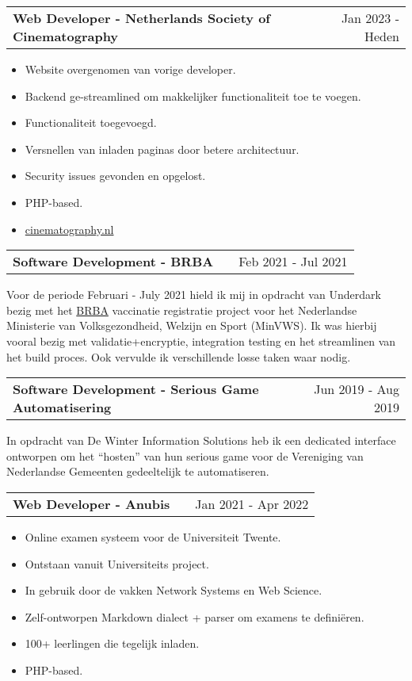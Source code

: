 \documentclass[a4paper,12pt]{article}
\makeatletter
\newenvironment{jobshort}[2]
    {
    \begin{tabularx}{\linewidth}{@{}l X r@{}}
    \textbf{#1} & \hfill &  #2 \\[3.75pt]
    \end{tabularx}
    }
    {
    }
\newenvironment{joblong}[2]
    {
    \begin{tabularx}{\linewidth}{@{}l X r@{}}
    \textbf{#1} & \hfill &  #2 \\[3.75pt]
    \end{tabularx}
    \begin{minipage}[t]{\linewidth}
    \begin{itemize}[nosep,after=\strut, leftmargin=1em, itemsep=3pt,label=--]
    }
    {
    \end{itemize}
    \end{minipage}    
    }
\makeatother
\begin{document}
\begin{joblong}{Web Developer - Netherlands Society of Cinematography}{Jan 2023 - Heden}
\item Website overgenomen van vorige developer.
\item Backend ge-streamlined om makkelijker functionaliteit toe te voegen.
\item Functionaliteit toegevoegd.
\item Versnellen van inladen paginas door betere architectuur.
\item Security issues gevonden en opgelost.
\item PHP-based.
\item \href{https://cinematography.nl}{cinematography.nl}
\end{joblong}

\begin{jobshort}{Software Development - BRBA}{Feb 2021 - Jul 2021}
Voor de periode Februari - July 2021 hield ik mij in opdracht van Underdark bezig met het \href{https://www.ronroozendaal.nl/blog/2021/05/een-nieuw-registratiesysteem-in-een-paar-weken-tijd}{BRBA} vaccinatie registratie project voor het Nederlandse Ministerie van
Volksgezondheid, Welzijn en Sport (MinVWS). Ik was hierbij vooral bezig met validatie+encryptie, integration testing en het streamlinen van het build proces. Ook vervulde ik verschillende losse taken waar nodig.
\end{jobshort}

\begin{jobshort}{Software Development - Serious Game Automatisering}{Jun 2019 - Aug 2019}
In opdracht van De Winter Information Solutions heb ik een dedicated interface ontworpen om het ``hosten'' van hun serious game voor de Vereniging van Nederlandse Gemeenten gedeeltelijk te automatiseren. 
\end{jobshort}

\begin{joblong}{Web Developer - Anubis}{Jan 2021 - Apr 2022}
\item Online examen systeem voor de Universiteit Twente.
\item Ontstaan vanuit Universiteits project.
\item In gebruik door de vakken Network Systems en Web Science.
\item Zelf-ontworpen Markdown dialect + parser om examens te definiëren. 
\item 100+ leerlingen die tegelijk inladen.
\item PHP-based.
\end{joblong}
  
\end{document}
